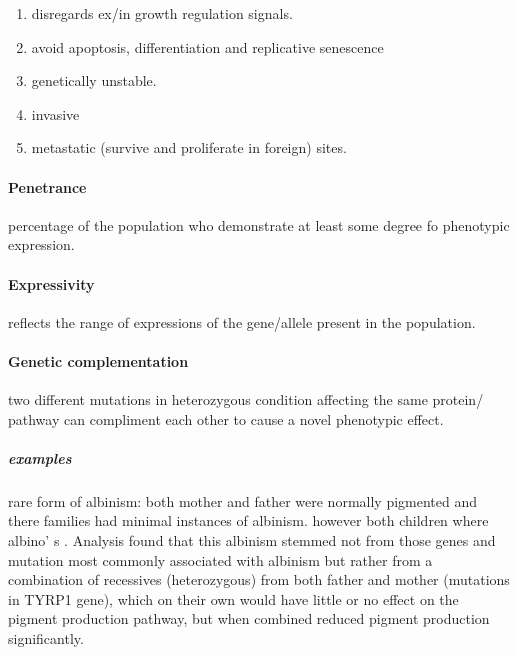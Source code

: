 \documentclass[]{article}
\providecommand{\tightlist}{%
  \setlength{\itemsep}{0pt}\setlength{\parskip}{0pt}}
\let\oldparagraph\paragraph
\renewcommand{\paragraph}[1]{\oldparagraph{#1}\mbox{}}
\let\oldsubparagraph\subparagraph
\renewcommand{\subparagraph}[1]{\oldsubparagraph{#1}\mbox{}}
\begin{document}
\begin{enumerate}
\def\labelenumi{\arabic{enumi}.}
\tightlist
\item
  disregards ex/in growth regulation signals.
\item
  avoid apoptosis, differentiation and replicative senescence
\item
  genetically unstable.
\item
  invasive
\item
  metastatic (survive and proliferate in foreign) sites.
\end{enumerate}

\hypertarget{penetrance}{%
\paragraph{Penetrance}\label{penetrance}}

percentage of the population who demonstrate at least some degree fo
phenotypic expression.

\hypertarget{expressivity}{%
\paragraph{Expressivity}\label{expressivity}}

reflects the range of expressions of the gene/allele present in the
population.

\hypertarget{genetic-complementation}{%
\paragraph{Genetic complementation}\label{genetic-complementation}}

two different mutations in heterozygous condition affecting the same
protein/ pathway can compliment each other to cause a novel phenotypic
effect.

\hypertarget{examples-1}{%
\subparagraph{examples}\label{examples-1}}

rare form of albinism: both mother and father were normally pigmented
and there families had minimal instances of albinism. however both
children where albino' s . Analysis found that this albinism stemmed not
from those genes and mutation most commonly associated with albinism but
rather from a combination of recessives (heterozygous) from both father
and mother (mutations in TYRP1 gene), which on their own would have
little or no effect on the pigment production pathway, but when combined
reduced pigment production significantly.
\end{document}
